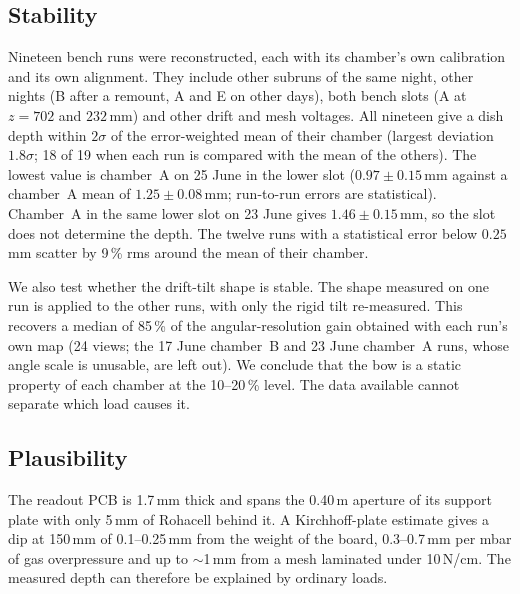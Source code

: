 \subsection{Stability}
Nineteen bench runs were reconstructed, each with its chamber's own calibration and its own alignment. They include
other subruns of the same night, other nights (B after a remount, A and E on other days), both bench slots (A at
$z=702$ and $232$\,mm) and other drift and mesh voltages. All nineteen give a dish depth within $2\sigma$ of the
error-weighted mean of their chamber (largest deviation $1.8\sigma$; 18 of 19 when each run is compared with the mean
of the others). The lowest value is chamber~A on 25 June in the lower slot ($0.97\pm0.15$\,mm against a chamber~A mean
of $1.25\pm0.08$\,mm; run-to-run errors are statistical). Chamber~A in the same lower slot on 23 June gives
$1.46\pm0.15$\,mm, so the slot does not determine the depth. The twelve runs with a statistical error below
$0.25$\,mm scatter by 9\,\% rms around the mean of their chamber.

We also test whether the drift-tilt shape is stable. The shape measured on one run is applied to the other runs, with
only the rigid tilt re-measured. This recovers a median of 85\,\% of the angular-resolution gain obtained with each
run's own map (24 views; the 17 June chamber~B and 23 June chamber~A runs, whose angle scale is unusable, are left
out). We conclude that the bow is a static property of each chamber at the 10--20\,\% level. The data available
cannot separate which load causes it.

\subsection{Plausibility}
The readout PCB is 1.7\,mm thick and spans the 0.40\,m aperture of its support plate with only 5\,mm of Rohacell
behind it. A Kirchhoff-plate estimate gives a dip at 150\,mm of 0.1--0.25\,mm from the weight of the board,
0.3--0.7\,mm per mbar of gas overpressure and up to $\sim$1\,mm from a mesh laminated under 10\,N/cm. The measured
depth can therefore be explained by ordinary loads.

